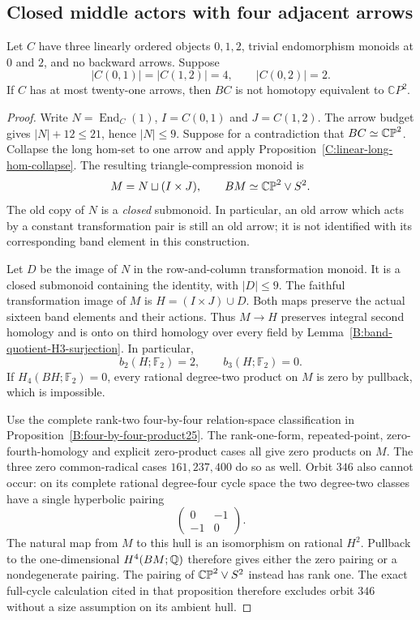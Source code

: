 \subsection{Closed middle actors with four adjacent arrows}

\begin{theorem}
\label{C:linear-four-by-four-two-long-21}
Let $C$ have three linearly ordered objects $0,1,2$, trivial
endomorphism monoids at $0$ and $2$, and no backward arrows.
Suppose
\[
 |C(0,1)|=|C(1,2)|=4,\qquad |C(0,2)|=2.
\]
If $C$ has at most twenty-one arrows, then $BC$ is not homotopy
equivalent to $\mathbb CP^2$.
\end{theorem}

\begin{proof}
Write $N=\operatorname{End}_C(1)$, $I=C(0,1)$ and
$J=C(1,2)$.  The arrow budget gives $|N|+12\le21$, hence
$|N|\le9$.  Suppose for a contradiction that $BC\simeq\mathbb {CP}^2$.
Collapse the long hom-set to one arrow and apply
Proposition~\ref{C:linear-long-hom-collapse}.  The resulting
triangle-compression monoid is
\[
 M=N\sqcup(I\times J),\qquad BM\simeq\mathbb {CP}^2\vee S^2.
\]
The old copy of $N$ is a \emph{closed} submonoid.  In particular,
an old arrow which acts by a constant transformation pair is still
an old arrow; it is not identified with its corresponding band
element in this construction.

Let $D$ be the image of $N$ in the row-and-column transformation
monoid.  It is a closed submonoid containing the identity, with
$|D|\le9$.  The faithful transformation image of $M$ is
$H=(I\times J)\cup D$.  Both maps preserve the actual sixteen
band elements and their actions.  Thus $M\to H$ preserves
integral second homology and is onto on third homology over every
field by Lemma~\ref{B:band-quotient-H3-surjection}.  In particular,
\[
 b_2(H;\mathbb F_2)=2,\qquad b_3(H;\mathbb F_2)=0.
\]
If $H_4(BH;\mathbb F_2)=0$, every rational degree-two product
on $M$ is zero by pullback, which is impossible.

Use the complete rank-two four-by-four relation-space
classification in Proposition~\ref{B:four-by-four-product25}.
The rank-one-form, repeated-point, zero-fourth-homology and
explicit zero-product cases all give zero products on $M$.
The three zero common-radical cases $161,237,400$ do so as well.
Orbit $346$ also cannot occur: on its complete rational
degree-four cycle space the two degree-two classes have a single
hyperbolic pairing
\[
 \begin{pmatrix}0&-1\\-1&0\end{pmatrix}.
\]
The natural map from $M$ to this hull is an isomorphism on
rational $H^2$.  Pullback to the one-dimensional $H^4(BM;\mathbb Q)$
therefore gives either the zero pairing or a nondegenerate
pairing.  The pairing of $\mathbb {CP}^2\vee S^2$ instead has rank one.
The exact full-cycle calculation cited in that proposition
therefore excludes orbit $346$ without a size assumption on its
ambient hull.


\end{proof}
